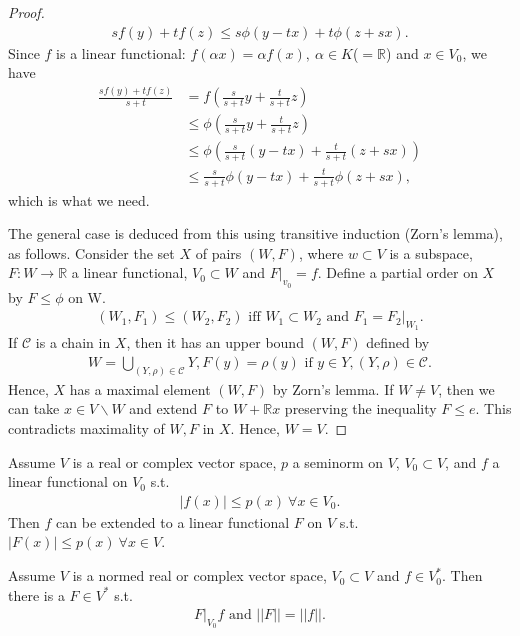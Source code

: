 \begin{proof}
\begin{align*}
    sf(y) + tf(z) \leq s\phi(y-tx) + t\phi(z+sx).
\end{align*}
Since \(f\) is a linear functional: \(f(\alpha x) = \alpha f(x), \ \alpha\in K\)(\(=\mathbb{R}\)) and \(x\in V_{0}\), we have
\begin{align*}
    \frac{sf(y) +tf(z)}{s+t} &= f\left(\frac{s}{s+t}y + \frac{t}{s+t}z\right) \\
    &\leq \phi\left(\frac{s}{s+t}y + \frac{t}{s+t}z\right) \\
    &\leq \phi\left(\frac{s}{s+t}(y-tx) + \frac{t}{s+t}(z+sx)\right) \\
    &\leq \frac{s}{s+t}\phi\left(y-tx\right) + \frac{t}{s+t}\phi\left(z+sx\right),
\end{align*}
which is what we need. 

The general case is deduced from this using transitive induction (Zorn's lemma), as follows. Consider the set \(X\) of pairs \((W,F)\), 
where \(w\subset V\) is a subspace, \(F:W\rightarrow \mathbb{R}\) a linear functional, \(V_0\subset W\) and \(F\vert_{v_0} = f\). Define
a partial order on \(X\) by \(F\leq \phi\) on W. 
\begin{align*}
    (W_1, F_1) \leq (W_2, F_2) \text{ iff } W_1\subset W_2\text{ and } F_1=F_2\vert_{W_1}.
\end{align*}
If \(\mathcal{C}\) is a chain in \(X\), then it has an upper bound \((W,F)\) defined by
\begin{align*}
    W = \bigcup\limits_{(Y,\rho)\in\mathcal{C}} Y, F(y) = \rho(y) \text{ if } y\in Y, (Y,\rho) \in\mathcal{C}.
\end{align*}
Hence, \(X\) has a maximal element \((W,F)\) by Zorn's lemma. If \(W\neq V\), then we can take \(x\in V\backslash W\) and extend \(F\) to
\(W+\mathbb{R}x\) preserving the inequality \(F\leq e\). This contradicts maximality of \(W,F\) in \(X\). Hence, \(W=V\).
\end{proof}
\fi 
\begin{theorem}
    Assume \(V\) is a real or complex vector space, \(p\) a seminorm on \(V\), \(V_0\subset V\), and \(f\) a linear functional on \(V_0\) s.t.
    \begin{align*}
        |f(x)|\leq p(x) \ \forall x\in V_0.
    \end{align*}
    Then \(f\) can be extended to a linear functional \(F\) on \(V\) s.t. \(|F(x)|\leq p(x) \ \forall x\in V\).
\end{theorem}
\begin{corollary}
    Assume \(V\) is a normed real or complex vector space, \(V_0\subset V\) and \(f\in V_{0}^{*}\). Then there is a \(F\in V^*\) s.t. 
    \begin{align*}
        F\vert_{V_0} f \text{ and } ||F|| = ||f||.
    \end{align*}
\end{corollary}
